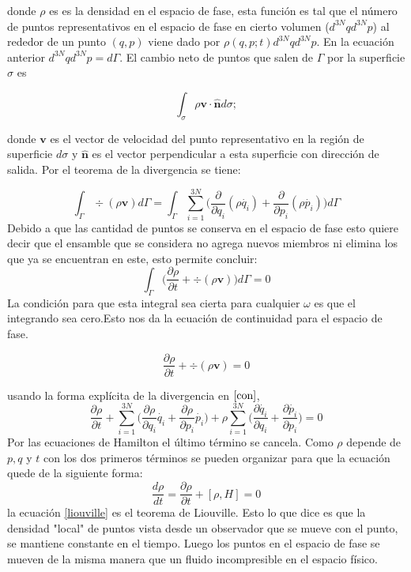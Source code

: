 donde $\rho$ es es la densidad en el espacio de fase, esta función es tal que el número de puntos representativos en el espacio de fase en cierto volumen ($d^{3N}q d^{3N}p$) al rededor de un punto $(q,p)$  viene dado por $\rho(q,p;t)d^{3N}q d^{3N}p$. En la ecuación anterior $d^{3N}q d^{3N}p=d\Gamma$. 
El cambio neto de puntos que salen de $\Gamma$ por la superficie $\sigma$ es

\begin{equation}
\int_{\sigma} \rho \mathbf{v \cdot \hat{n}} d\sigma;
\end{equation}

donde $\mathbf{v}$ es el vector de velocidad del punto representativo en la región de superficie $d\sigma$ y $\mathbf{\hat{n}}$ es el vector perpendicular a esta superficie con dirección de salida. Por el teorema de la divergencia se tiene:

\begin{equation}
\int_{\Gamma} \div{ ( \rho\mathbf{v} ) } d\Gamma = \int_{\Gamma} \sum_{i=1}^{3N} \Big( \frac{\partial}{\partial q_{i}}(\rho \dot{q_{i}})+ \frac{\partial}{\partial p_{i}} (\rho \dot{p_{i}}) \Big) d\Gamma
\end{equation}
Debido a que las cantidad de puntos se conserva en el espacio de fase esto quiere decir que el ensamble que se considera no agrega nuevos miembros ni elimina los que ya se encuentran en este, esto permite concluir:
\begin{equation}
 \int_{\Gamma} \Big( \frac{\partial \rho}{\partial t} + \div{ ( \rho\mathbf{v} ) } \Big) d\Gamma =0
\end{equation}
La condición para que esta integral sea cierta para cualquier $\omega$ es que el integrando sea cero.Esto nos da la ecuación de continuidad para el espacio de fase.

\begin{equation} \label{con}
 \frac{\partial \rho}{\partial t} + \div{ ( \rho\mathbf{v} ) }=0
\end{equation}

usando la forma explícita de la divergencia en $\ref{con}$,
\begin{equation}
 \frac{\partial \rho}{\partial t} +\sum_{i=1}^{3N} \Big( \frac{\partial\rho}{\partial q_{i}}\dot{q_{i}}+  \frac{\partial\rho}{\partial p_{i}}\dot{p_{i}} \Big) + \rho \sum_{i=1}^{3N} \Big( \frac{\partial \dot{q_{i}}}{\partial q_{i}} + \frac{\partial \dot{p_{i}}}{\partial p_{i}}\Big)=0
\end{equation}
Por las ecuaciones de Hamilton el último término se cancela. Como $\rho$ depende de $p,q$ y $t$ con los dos primeros términos se pueden organizar para que la ecuación quede de la siguiente forma:
\begin{equation} \label{liouville}
\frac{d \rho}{dt}= \frac{\partial \rho}{\partial t} + [ \rho, H ]=0
\end{equation}
la ecuación \ref{liouville} es el teorema de Liouville. Esto lo que dice es que la densidad "local" de puntos vista desde un observador que se mueve con el punto, se mantiene constante en el tiempo. Luego los puntos en el espacio de fase se mueven de la misma manera que un fluido incompresible en el espacio físico.

